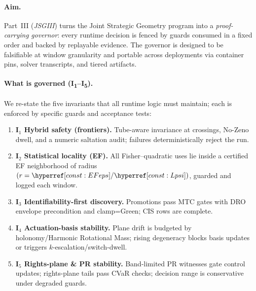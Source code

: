 \paragraph{Aim.}
Part~III (\emph{JSGIII}) turns the Joint Strategic Geometry program into a \emph{proof-carrying governor}: every runtime decision is fenced by guards consumed in a fixed order and backed by replayable evidence. The governor is designed to be falsifiable at window granularity and portable across deployments via container pins, solver transcripts, and tiered artifacts.

\paragraph{What is governed (I\textsubscript{1}–I\textsubscript{5}).}
We re-state the five invariants that all runtime logic must maintain; each is enforced by specific guards and acceptance tests:
\begin{enumerate}[leftmargin=*]
\item \textbf{I\(_1\) Hybrid safety (frontiers).} Tube-aware invariance at crossings, No-Zeno dwell, and a numeric saltation audit; failures deterministically reject the run. 
\item \textbf{I\(_2\) Statistical locality (EF).} All Fisher–quadratic uses lie inside a certified EF neighborhood of radius $(r=\constref{EFeps}/\constref{Lpsi})$, guarded and logged each window. 
\item \textbf{I\(_3\) Identifiability-first discovery.} Promotions pass MTC gates with DRO envelope precondition and clamp=Green; CIS rows are complete. 
\item \textbf{I\(_4\) Actuation-basis stability.} Plane drift is budgeted by holonomy/Harmonic Rotational Mass; rising degeneracy blocks basis updates or triggers $k$-escalation/switch-dwell. 
\item \textbf{I\(_5\) Rights-plane \& PR stability.} Band-limited PR witnesses gate control updates; rights-plane tails pass CVaR checks; decision range is conservative under degraded guards. 
\end{enumerate}

